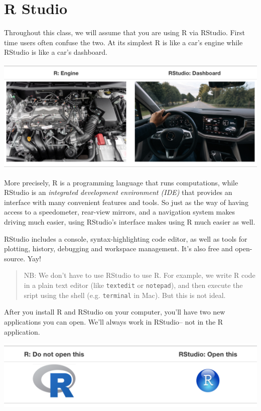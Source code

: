\documentclass[]{book}
\begin{document}
\hypertarget{r-studio-1}{\section{R Studio}\label{r-studio-1}}

Throughout this class, we will assume that you are using R via RStudio.
First time users often confuse the two. At its simplest R is like a
car's engine while RStudio is like a car's dashboard.

\begin{center}\includegraphics[width=0.7\linewidth]{img/R_vs_RStudio_1} \end{center}

More precisely, R is a programming language that runs computations,
while RStudio is an \emph{integrated development environment (IDE)} that
provides an interface with many convenient features and tools. So just
as the way of having access to a speedometer, rear-view mirrors, and a
navigation system makes driving much easier, using RStudio's interface
makes using R much easier as well.

RStudio includes a console, syntax-highlighting code editor, as well as
tools for plotting, history, debugging and workspace management. It's
also free and open-source. Yay!

\begin{quote}
NB: We don't have to use RStudio to use R. For example, we write R code
in a plain text editor (like \texttt{textedit} or \texttt{notepad}), and
then execute the sript using the shell (e.g. \texttt{terminal} in Mac).
But this is not ideal.
\end{quote}

After you install R and RStudio on your computer, you'll have two new
applications you can open. We'll always work in RStudio-- not in the R
application.

\begin{center}\includegraphics[width=0.7\linewidth]{img/R_vs_RStudio} \end{center}
\end{document}
